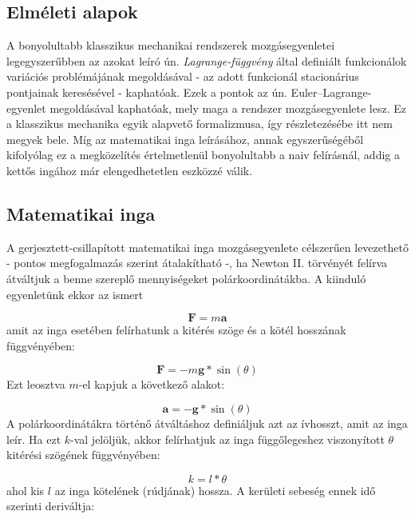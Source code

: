 \begin{multicols}{2}
\section{Elméleti alapok} \label{sec:2}
A bonyolultabb klasszikus mechanikai rendszerek mozgásegyenletei legegyszerűbben az azokat leíró ún. \emph{Lagrange-függvény} által definiált funkcionálok variációs problémájának megoldásával - az adott funkcionál stacionárius pontjainak keresésével - kaphatóak. Ezek a pontok az ún. Euler--Lagrange-egyenlet megoldásával kaphatóak, mely maga a rendszer mozgásegyenlete lesz\cite{gyorgyigeza}. Ez a klasszikus mechanika egyik alapvető formalizmusa, így részletezésébe itt nem megyek bele. Míg az matematikai inga leírásához, annak egyszerűségéből kifolyólag ez a megközelítés értelmetlenül bonyolultabb a naiv felírásnál, addig a kettős ingához már elengedhetetlen eszközzé válik.

\subsection{Matematikai inga} \label{sub:2.1}
A gerjesztett-csillapított matematikai inga mozgásegyenlete célszerűen levezethető - pontos megfogalmazás szerint átalakítható -, ha Newton II. törvényét felírva átváltjuk a benne szereplő mennyiségeket polárkoordinátákba. A kiinduló egyenletünk ekkor az ismert

\begin{equation}
    \boldsymbol{F} = m \boldsymbol{a}
\end{equation}
amit az inga esetében felírhatunk a kitérés szöge és a kötél hosszának függvényében:

\begin{equation}
    \boldsymbol{F} = -m \boldsymbol{g} * \sin{\left( \theta \right)}
\end{equation}
Ezt leosztva $m$-el kapjuk a következő alakot:

\begin{equation}
    \boldsymbol{a} = -\boldsymbol{g} * \sin{\left( \theta \right)}
\end{equation}
A polárkoordinátákra történő átváltáshoz definiáljuk azt az ívhosszt, amit az inga leír. Ha ezt $k$-val jelöljük, akkor felírhatjuk az inga függőlegeshez viszonyított $\theta$ kitérési szögének függvényében:

\begin{equation}
    k = l * \theta
\end{equation}
ahol kis $l$ az inga kötelének (rúdjának) hossza. A kerületi sebeség ennek idő szerinti deriváltja:


\end{multicols}
